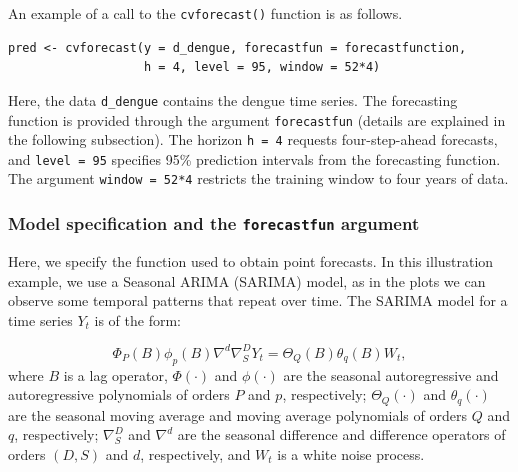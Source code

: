 An example of a call to the \texttt{cvforecast()} function is as follows.

\begin{verbatim}
pred <- cvforecast(y = d_dengue, forecastfun = forecastfunction,
                   h = 4, level = 95, window = 52*4)
\end{verbatim}

Here, the data \texttt{d\_dengue} contains the dengue time series. The
forecasting function is provided through the argument \texttt{forecastfun}
(details are explained in the following subsection). The horizon \texttt{h\ =\ 4}
requests four-step-ahead forecasts, and \texttt{level\ =\ 95} specifies 95\%
prediction intervals from the forecasting function. The argument
\texttt{window\ =\ 52*4} restricts the training window to four years of data.

\subsubsection{\texorpdfstring{Model specification and the \texttt{forecastfun} argument}{Model specification and the forecastfun argument}}\label{model-specification-and-the-forecastfun-argument}

Here, we specify the function used to obtain point forecasts. In this
illustration example, we use a Seasonal ARIMA (SARIMA) model, as in the
plots we can observe some temporal patterns that repeat over time. The
SARIMA model for a time series \(Y_t\) is of the form:

\[
\Phi_P(B)\phi_p(B)\nabla^{d}\nabla^{D}_{S}Y_t=\Theta_{Q}(B)\theta_q(B)W_t,
\] where \(B\) is a lag operator, \(\Phi(\cdot)\) and \(\phi(\cdot)\) are the
seasonal autoregressive and autoregressive polynomials of orders \(P\) and
\(p\), respectively; \(\Theta_Q(\cdot)\) and \(\theta_q(\cdot)\) are the
seasonal moving average and moving average polynomials of orders \(Q\) and
\(q\), respectively; \(\nabla^D_S\) and \(\nabla^d\) are the seasonal
difference and difference operators of orders \((D,S)\) and \(d\),
respectively, and \(W_t\) is a white noise process.

